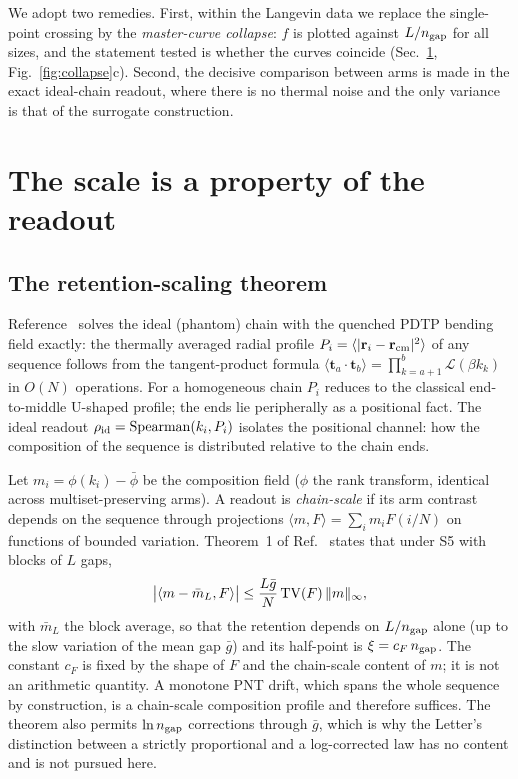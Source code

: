 \documentclass[reprint,amsmath,amssymb,aps,pre,longbibliography]{revtex4-2}
\begin{document}
We adopt two remedies. First, within the Langevin data we replace the single-point crossing
by the \emph{master-curve collapse}: $f$ is plotted against $L/n_{\rm gap}$ for all sizes,
and the statement tested is whether the curves coincide (Sec.~\ref{sec:scale},
Fig.~\ref{fig:collapse}c). Second, the decisive comparison between arms is made in the
exact ideal-chain readout, where there is no thermal noise and the only variance is that of
the surrogate construction.

\section{The scale is a property of the readout}\label{sec:scale}

\subsection{The retention-scaling theorem}

Reference~\cite{PDTP4} solves the ideal (phantom) chain with the quenched PDTP bending field
exactly: the thermally averaged radial profile $P_i=\langle|\mathbf r_i-\mathbf r_{\rm cm}|^2\rangle$
of any sequence follows from the tangent-product formula
$\langle\mathbf t_a\cdot\mathbf t_b\rangle=\prod_{k=a+1}^{b}\mathcal L(\beta k_k)$ in
$O(N)$ operations. For a homogeneous chain $P_i$ reduces to the classical end-to-middle
U-shaped profile; the ends lie peripherally as a positional fact. The ideal readout
$\rho_{\rm id}={\rm Spearman}(k_i,P_i)$ isolates the positional channel: how the
composition of the sequence is distributed relative to the chain ends.

Let $m_i=\phi(k_i)-\bar\phi$ be the composition field ($\phi$ the rank transform, identical
across multiset-preserving arms). A readout is \emph{chain-scale} if its arm contrast depends
on the sequence through projections $\langle m,F\rangle=\sum_i m_iF(i/N)$ on functions of
bounded variation. Theorem~1 of Ref.~\cite{PDTP4} states that under S5 with blocks of $L$
gaps,
\begin{equation}
\big|\langle m-\bar m_L,F\rangle\big|\le\frac{L\bar g}{N}\,{\rm TV}(F)\,\|m\|_\infty ,
\label{eq:tv}
\end{equation}
with $\bar m_L$ the block average, so that the retention depends on $L/n_{\rm gap}$ alone
(up to the slow variation of the mean gap $\bar g$) and its half-point is
$\xi=c_F\,n_{\rm gap}$. The constant $c_F$ is fixed by the shape of $F$ and the chain-scale
content of $m$; it is not an arithmetic quantity. A monotone PNT drift, which spans the
whole sequence by construction, is a chain-scale composition profile and therefore
suffices. The theorem also permits $\ln n_{\rm gap}$ corrections through $\bar g$, which
is why the Letter's distinction between a strictly proportional and a log-corrected law has
no content and is not pursued here.
\end{document}

